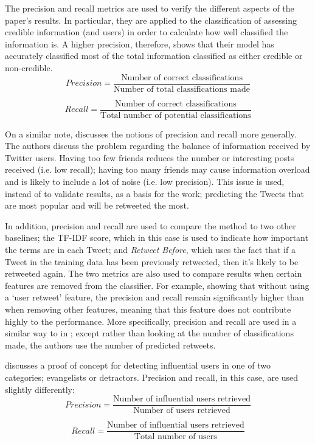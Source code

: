 The precision and recall metrics are used to verify the different aspects of the paper's results. In particular, they are applied to the classification of assessing credible information (and users) in order to calculate how well classified the information is. A higher precision, therefore, shows that their model has accurately classified most of the total information classified as either credible or non-credible.
\[	
	Precision = \frac{\text{Number of correct classifications}}{\text{Number of total classifications made}}
\]

\[
	Recall = \frac{\text{Number of correct classifications}}{\text{Total number of potential classifications}}
\]

On a similar note, \cite{hong11} discusses the notions of precision and recall more generally. The authors discuss the problem regarding the balance of information received by Twitter users. Having too few friends reduces the number or interesting posts received (i.e. low recall); having too many friends may cause information overload and is likely to include a lot of noise (i.e. low precision). This issue is used, instead of to validate results,  as a basis for the work; predicting the Tweets that are most popular and will be retweeted the most.

In addition, precision and recall are used to compare the method to two other baselines; the TF-IDF score, which in this case is used to indicate how important the terms are in each Tweet; and \emph{Retweet Before}, which uses the fact that if a Tweet in the training data has been previously retweeted, then it's likely to be retweeted again. The two metrics are also used to compare results when certain features are removed from the classifier. For example, showing that without using a `user retweet' feature, the precision and recall remain significantly higher than when removing other features, meaning that this feature does not contribute highly to the performance. More specifically, precision and recall are used in a similar way to in \cite{castillo11}; except rather than looking at the number of classifications made, the authors use the number of predicted retweets.

\cite{bigonha10} discusses a proof of concept for detecting influential users in one of two categories; evangelists or detractors. Precision and recall, in this case, are used slightly differently:
\[	
	Precision = \frac{\text{Number of influential users retrieved}}{\text{Number of users retrieved}}
\]

\[
	Recall = \frac{\text{Number of influential users retrieved}}{\text{Total number of users}}
\]

